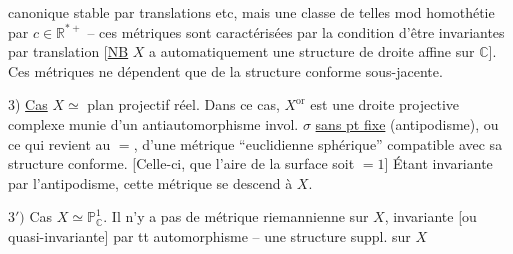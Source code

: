 
canonique stable par translations etc, mais une classe de telles mod homothétie par $c\in\mathbb R^{*+}$ -- ces métriques sont caractérisées par la condition d'être invariantes par translation [\uline{NB} $X$ a automatiquement une structure de droite affine sur $\mathbb C$]. Ces métriques  ne dépendent que de la structure conforme sous-jacente.

3) \uline{Cas}  $X\simeq$ plan projectif réel. Dans ce   cas, $X^{\mathrm{or}}$ est une droite projective complexe munie d'un antiautomorphisme invol. $\sigma$ \uline{sans pt fixe} (antipodisme), ou ce qui revient au $=$, d'une métrique ``euclidienne sphérique'' compatible avec sa structure conforme. [Celle-ci,     que l'aire de la surface soit $=1$] Étant invariante par l'antipodisme, cette métrique se descend à $X$.

$3')$ Cas $X\simeq\mathbb P^1_{\mathbb C}$. Il n'y a pas de métrique riemannienne sur $X$, invariante [ou quasi-invariante] par tt automorphisme --  une structure suppl. sur $X$

